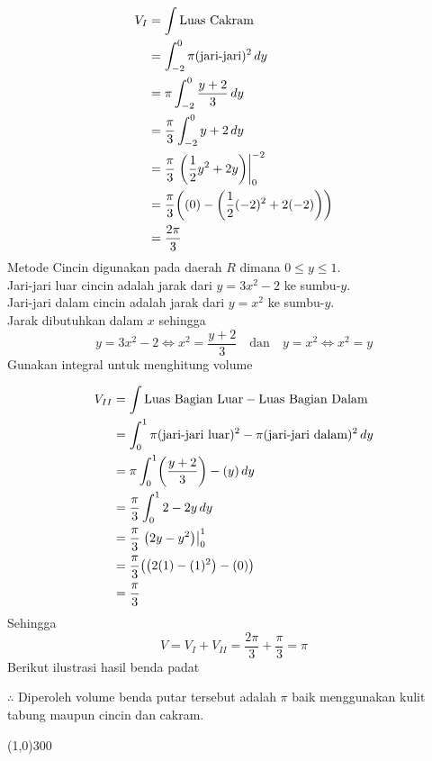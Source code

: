 \begin{enumerate}[leftmargin=*, label={\arabic*}.]
\begin{enumerate}[label={\alph*}.]
    \begin{align*}
        V_I &= \int \text{Luas Cakram}\\
        &=\int_{-2}^{0} \pi(\text{jari-jari})^2\,dy\\
        &=\pi\int_{-2}^{0} \frac{y+2}{3}\,dy\\
        &=\frac{\pi}{3}\int_{-2}^{0} y+2\,dy\\
        &=\frac{\pi}{3}\eval{\frac{1}{2}y^{2}+2y}{0}{-2}\\
        &=\frac{\pi}{3}\brk*{(0)-\brk*{\frac{1}{2}(-2)^{2}+2(-2)}}\\
        &=\frac{2\pi}{3}
    \end{align*}
    Metode Cincin digunakan pada daerah $R$ dimana $0 \leq y \leq 1$.\\
    Jari-jari luar cincin adalah jarak dari $y=3x^{2}-2$ ke sumbu-$y$.\\
    Jari-jari dalam cincin adalah jarak dari $y=x^{2}$ ke sumbu-$y$.\\
    Jarak dibutuhkan dalam $x$ sehingga
    \[
        y=3x^{2}-2 \iff x^{2}=\frac{y+2}{3}\quad \text{dan} \quad y=x^{2} \iff x^{2}=y
    \]
    Gunakan integral untuk menghitung volume

    \begin{align*}
        V_{II} &= \int \text{Luas Bagian Luar} - \text{Luas Bagian Dalam}\\
        &=\int_{0}^{1} \pi(\text{jari-jari luar})^2 - \pi (\text{jari-jari dalam})^{2}\,dy\\
        &=\pi \int_{0}^{1} \brk*{\frac{y+2}{3}} -(y)\,dy\\
        &=\frac{\pi}{3}\int_{0}^{1} 2-2y\,dy\\
        &=\frac{\pi}{3}\eval{2y-y^{2}}{0}{1}\\
        &=\frac{\pi}{3}\brk*{\brk*{2(1)-(1)^{2}}-(0)}\\
        &=\frac{\pi}{3}
    \end{align*}
    Sehingga 
    \[
        V = V_{I}+V_{II} = \frac{2\pi}{3}+\frac{\pi}{3} = \pi
    \]
    Berikut ilustrasi hasil benda padat

    
    
    $\therefore$ Diperoleh volume benda putar tersebut adalah $\pi$ baik menggunakan kulit tabung 
    maupun cincin dan cakram.

    \end{enumerate}

\begin{center}\line(1,0){300}\end{center}



\end{enumerate}
